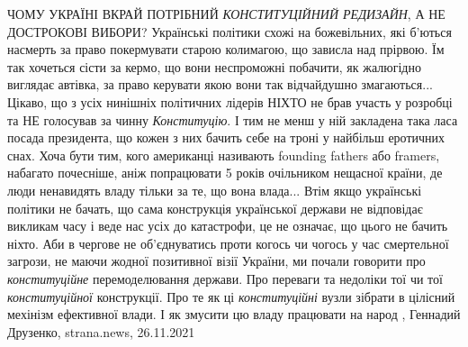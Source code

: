 ЧОМУ УКРАЇНІ ВКРАЙ ПОТРІБНИЙ \emph{КОНСТИТУЦІЙНИЙ РЕДИЗАЙН}, А НЕ ДОСТРОКОВІ ВИБОРИ?
Українські політики схожі на божевільних, які б'ються насмерть за право
покермувати старою колимагою, що зависла над прірвою. Їм так хочеться сісти за
кермо, що вони неспроможні побачити, як жалюгідно виглядає автівка, за право
керувати якою вони так відчайдушно змагаються...  Цікаво, що з усіх нинішніх
політичних лідерів НІХТО не брав участь у розробці та НЕ голосував за чинну
\emph{Конституцію}. І тим не менш у ній закладена така ласа посада президента, що
кожен з них бачить себе на троні у найбільш еротичних снах. Хоча бути тим, кого
американці називають founding fathers або framers, набагато почесніше, аніж
попрацювати 5 років очільником нещасної країни, де люди ненавидять владу тільки
за те, що вона влада...  Втім якщо українські політики не бачать, що сама
конструкція української держави не відповідає викликам часу і веде нас усіх до
катастрофи, це не означає, що цього не бачить ніхто.  Аби в чергове не
об'єднуватись проти когось чи чогось у час смертельної загрози, не маючи жодної
позитивної візії України, ми почали говорити про \emph{конституційне} перемоделювання
держави. Про переваги та недоліки тої чи тої \emph{конституційної} конструкції. Про те
як ці \emph{конституційні} вузли зібрати в цілісний мехінізм ефективної влади. І як
змусити цю владу працювати на народ
, 
Геннадий Друзенко, strana.news, 26.11.2021
